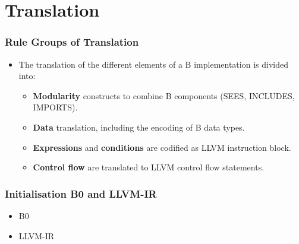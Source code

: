 \documentclass[12pt]{beamer}
\begin{document}
\section{Translation}



\begin{frame}
	\frametitle{Rule Groups of Translation}

\begin{itemize}
\item The translation of the different elements of a B
implementation is divided into:
	\begin{itemize}
	\item \textbf{Modularity} constructs to combine B components (SEES, INCLUDES, IMPORTS).
	\item \textbf{Data} translation, including the encoding of B data types.
	\item \textbf{Expressions} and \textbf{conditions} are codified as LLVM instruction block.
	\item \textbf{Control flow} are translated to LLVM control flow statements.
	\end{itemize}
\end{itemize}

\end{frame}




\begin{frame}[fragile]
\frametitle{Initialisation B0 and LLVM-IR }

\begin{itemize} \item B0
\end{itemize}
\scriptsize{
%
}

\begin{itemize} \item LLVM-IR
\end{itemize}

\scriptsize{
%
%
}

\end{frame}
\end{document}
